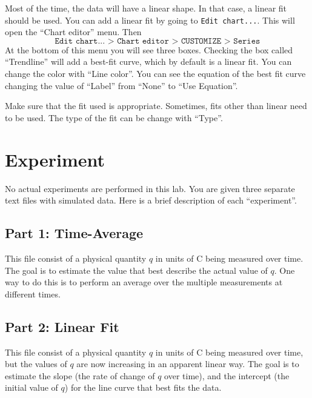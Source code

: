 Most of the time, the data will have a linear shape. In that case, a linear fit should be used. You can add a linear fit by going to \texttt{Edit chart...}. This will open the ``Chart editor'' menu. Then
\begin{equation}
    \texttt{Edit chart... > Chart editor > CUSTOMIZE > Series}
\end{equation}
At the bottom of this menu you will see three boxes. Checking the box called ``Trendline'' will add a best-fit curve, which by default is a linear fit. You can change the color with ``Line color''. You can see the equation of the best fit curve changing the value of ``Label'' from ``None'' to ``Use Equation''.

Make sure that the fit used is appropriate. Sometimes, fits other than linear need to be used. The type of the fit can be change with ``Type''.
\section{Experiment}
No actual experiments are performed in this lab. You are given three separate text files with simulated data. Here is a brief description of each ``experiment''.
\subsection{Part 1: Time-Average}
This file consist of a physical quantity $q$ in units of C being measured over time. The goal is to estimate the value that best describe the actual value of $q$. One way to do this is to perform an average over the multiple measurements at different times.
\subsection{Part 2: Linear Fit}
This file consist of a physical quantity $q$ in units of C being measured over time, but the values of $q$ are now increasing in an apparent linear way. The goal is to estimate the slope (the rate of change of $q$ over time), and the intercept (the initial value of $q$) for the line curve that best fits the data.
